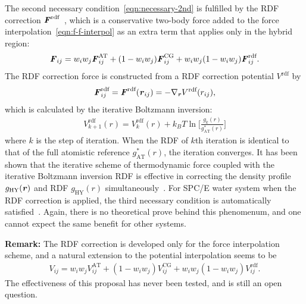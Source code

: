 \documentclass[epjST]{svjour}
\newcommand{\vect}[1]{\textbf{\textit{#1}}}
\newcommand{\AT}[0]{\textrm{AT}}
\newcommand{\HY}[0]{\textrm{HY}}
\newcommand{\CG}[0]{\textrm{CG}}
\newcommand{\moleidxone}[0]{i}
\newcommand{\moleidxtwo}[0]{j}
\newcommand{\rdf}{{\textrm{rdf}}}
\begin{document}
The second necessary condition~\eqref{eqn:necessary-2nd} is fulfilled by the
RDF correction $\vect F^\rdf$~\cite{wang2012adaptive}, which is a conservative two-body force added to the force interpolation~\eqref{eqn:f-f-interpol} as an extra term
that applies only in the hybrid region:
\begin{align}\label{eqn:rdf-corr-f}
  {\vect F}_{\moleidxone \moleidxtwo}
  =
  w_\moleidxone w_\moleidxtwo{\vect F}_{\moleidxone\moleidxtwo}^{\AT}
  +
  (1-w_\moleidxone w_\moleidxtwo){\vect F}^{\CG}_{\moleidxone\moleidxtwo}
  +
  w_\moleidxone w_\moleidxtwo(1-w_\moleidxone w_\moleidxtwo){\vect F}^{\rdf}_{\moleidxone\moleidxtwo}.
\end{align}
The RDF correction force is constructed from a RDF correction potential $V^\rdf$ by
\begin{align}
  \vect F_{\moleidxone\moleidxtwo}^\rdf = \vect F^\rdf(\vect r_{\moleidxone\moleidxtwo})
  = -\nabla_{\vect r} V^\rdf(r_{\moleidxone\moleidxtwo}),
\end{align}
which is calculated by the iterative Boltzmann inversion:
\begin{align}
  V_{k+1}^\rdf(r) = V_k^\rdf(r) + k_BT \ln \Big[\frac{g_k(r)}{g^\ast_\AT(r)}\Big] 
\end{align}
where $k$ is the step of iteration. When the RDF of $k$th iteration is
identical to that of the full atomistic reference $g^\ast_\AT(r)$, the
iteration converges. It has been shown that the iterative scheme of
thermodynamic force coupled with the iterative Boltzmann inversion RDF
is effective in correcting the density profile $g_\HY(\vect r)$ and
RDF $g_\HY(r)$ simultaneously~\cite{wang2012adaptive}.
For SPC/E water system when the RDF correction is applied, the third
necessary condition is automatically satisfied~\cite{wang2013grand}. Again, there is no
theoretical prove behind this phenomenum, and one cannot expect the same
benefit for other systems.

\noindent\textbf{Remark:} The RDF correction is developed only for the force interpolation scheme,
and a natural extension to the potential interpolation seems to be
\begin{align}
  {V}_{\moleidxone \moleidxtwo}
  =
  w_\moleidxone w_\moleidxtwo{V}_{\moleidxone\moleidxtwo}^{\AT}
  +
  (1-w_\moleidxone w_\moleidxtwo){V}^{\CG}_{\moleidxone\moleidxtwo}
  +
  w_\moleidxone w_\moleidxtwo(1-w_\moleidxone w_\moleidxtwo){V}^{\rdf}_{\moleidxone\moleidxtwo}.  
\end{align}
The effectiveness of this proposal has never been tested, and is still an open question.
\end{document}
